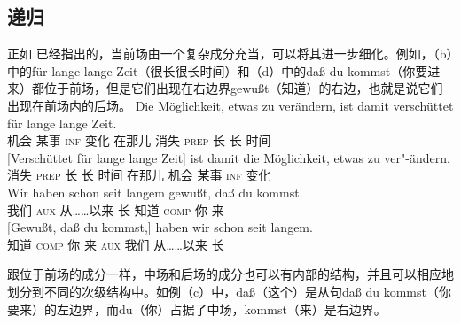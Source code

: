 \subsection{递归}
\label{sec-topo-rekursion}
%
正如 \citet[]{Reis80a}已经指出的，当前场由一个复杂成分充当，可以将其进一步细化。例如，（b）中的für lange lange Zeit（很长很长时间）和（d）中的daß du kommst（你要进来）都位于前场，但是它们出现在右边界gewußt（知道）的右边，也就是说它们出现在前场内的后场。
\eal
\label{Beispiel-topologisch-komplexes-Vorfeld}
\ex
\gll Die Möglichkeit, etwas zu verändern, ist damit verschüttet für lange lange Zeit.\\
	  机会 某事 \textsc{inf} 变化 \passiveprs{} 在那儿 消失 \textsc{prep} 长 长 时间\\
\ex 
\gll {}[Verschüttet für lange lange Zeit] ist damit die Möglichkeit,      etwas zu ver"-ändern.\\
      \spacebr{}消失 \textsc{prep} 长 长 时间 \passiveprs{} 在那儿  机会  某事 \textsc{inf} 变化\\
\ex 
\gll Wir haben        schon       seit          langem gewußt, daß du kommst.\\
     我们 \textsc{aux} \particle{} 从……以来 长     知道     \textsc{comp} 你 来\\
\ex 
\gll {}[Gewußt, daß du kommst,] haben wir schon seit langem.\\
	 \spacebr{}知道 \textsc{comp} 你 来 \textsc{aux} 我们 \particle{} 从……以来 长\\
\zl

\noindent
跟位于前场的成分一样，中场和后场的成分也可以有内部的结构，并且可以相应地划分到不同的次级结构中。如例（c）中，daß（这个）是从句daß du kommst（你要来）的左边界，而du（你）占据了中场，kommst（来）是右边界。

